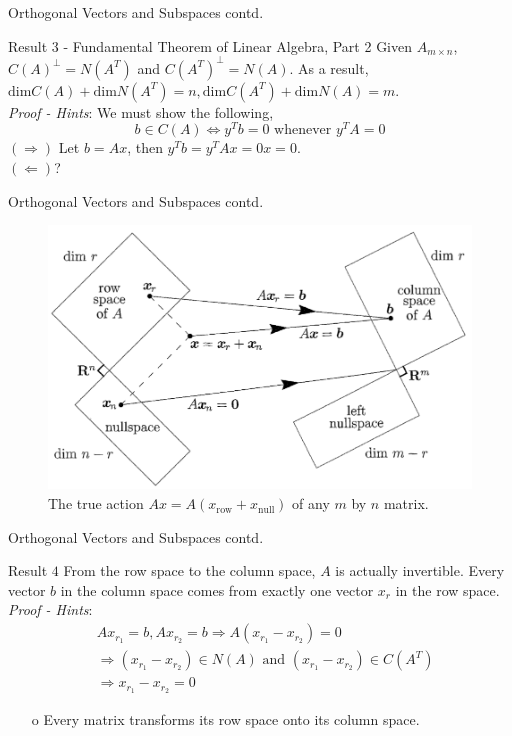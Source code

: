 \documentclass{beamer}
\begin{document}
\begin{frame}{Orthogonal Vectors and Subspaces contd.}
\begin{block}{Result $3$ - Fundamental Theorem of Linear Algebra, Part 2}
Given $A_{m\times n}$, $C(A)^{\perp} = N(A^T)$ and $C(A^T)^{\perp} = N(A)$. As a result, $\text{dim}C(A)+\text{dim}N(A^T) = n, \text{dim}C(A^T) + \text{dim}N(A) = m$.\\
\textit{Proof - Hints}: We must show the following,
\begin{equation*}
    b \in C(A) \iff y^Tb = 0 \text{ whenever } y^TA = 0
\end{equation*}
$(\Rightarrow)$ Let $b = Ax$, then $y^Tb = y^TAx = 0x = 0$.\\
$(\Leftarrow)$?
\end{block}
\end{frame}

\begin{frame}{Orthogonal Vectors and Subspaces contd.}
\begin{figure}
    \centering
    \includegraphics[scale=0.4]{fig_2}
    \caption{The true action $Ax = A(x_{\text{row}} + x_{\text{null}})$ of any $m$ by $n$ matrix.}
    \label{fig:my_label}
\end{figure}
\end{frame}

\begin{frame}{Orthogonal Vectors and Subspaces contd.}
\begin{block}{Result $4$}
From the row space to the column space, $A$ is actually invertible. Every vector $b$ in the column space comes from exactly one vector $x_r$ in the row space.\\
\textit{Proof - Hints}:
\begin{align*}
    &Ax_{r_1} = b, Ax_{r_2} = b \Rightarrow A(x_{r_1} - x_{r_2}) = 0\\
    &\Rightarrow (x_{r_1} - x_{r_2}) \in N(A) \text{ and } (x_{r_1} - x_{r_2}) \in C(A^T)\\
    &\Rightarrow x_{r_1} - x_{r_2} = 0
\end{align*}
\begin{itemize}
    \item[o] Every matrix transforms its row space onto its column space.
\end{itemize}
\end{block}
\end{frame}
\end{document}
